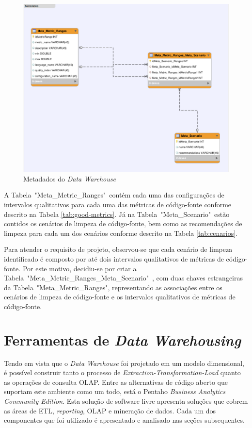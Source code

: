 \begin{figure}[ht!]
\centering
\includegraphics[keepaspectratio=false,scale=0.5]{figuras/metadados.eps}
\caption{Metadados do \textit{Data Warehouse}}
\label{fig:metadados}
\end{figure}
\FloatBarrier


A Tabela~"Meta\_Metric\_Ranges"~contém cada uma das configurações de intervalos qualitativos para cada uma das métricas de código-fonte conforme descrito na Tabela \ref{tab:good-metrics}. Já na Tabela~"Meta\_Scenario"~estão contidos os cenários de limpeza de código-fonte, bem como as recomendações de limpeza para cada um dos cenários conforme descrito na Tabela \ref{tab:cenarios}. 


Para atender o requisito de projeto, observou-se que cada cenário de limpeza identificado é composto por até dois intervalos qualitativos de métricas de código-fonte. Por este motivo, decidiu-se por criar a Tabela~"Meta\_Metric\_Ranges\_Meta\_Scenario"~, com duas chaves estrangeiras da Tabela~"Meta\_Metric\_Ranges", representando as associações entre os cenários de limpeza de código-fonte e os intervalos qualitativos de métricas de código-fonte.



\section{Ferramentas de \textit{Data Warehousing}}

Tendo em vista que o \textit{Data Warehouse} foi projetado em um modelo dimensional, é possível construir tanto o processo de \textit{Extraction-Transformation-Load} quanto as operações de consulta OLAP. Entre as alternativas de código aberto que suportam este ambiente como um todo, está o Pentaho \textit{Business Analytics Community Edition}. Esta solução de software livre apresenta soluções que cobrem 
as áreas de ETL, \textit{reporting}, OLAP e mineração de dados. Cada um dos componentes que foi utilizado é apresentado e analisado nas seções subsequentes.
 


